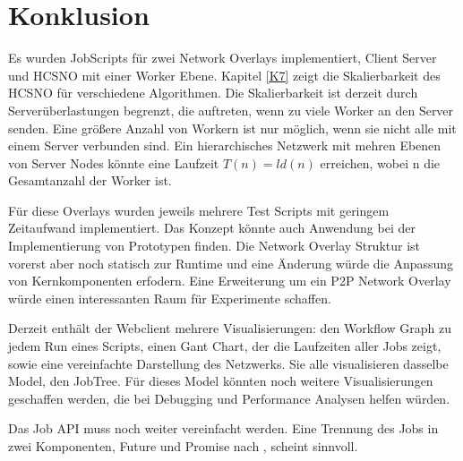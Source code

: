 \section{Konklusion}
Es wurden JobScripts für zwei Network Overlays implementiert, Client Server und HCSNO mit einer Worker Ebene. Kapitel \ref{K7} zeigt die Skalierbarkeit des HCSNO für verschiedene Algorithmen. Die Skalierbarkeit ist derzeit durch Serverüberlastungen begrenzt, die auftreten, wenn zu viele Worker an den Server senden. Eine größere Anzahl von Workern ist nur möglich, wenn sie nicht alle mit einem Server verbunden sind. Ein hierarchisches Netzwerk mit mehren Ebenen von Server Nodes könnte eine Laufzeit  $T(n) = ld(n)$ erreichen, wobei n die Gesamtanzahl der Worker ist.

Für diese Overlays wurden jeweils mehrere Test Scripts mit geringem Zeitaufwand  implementiert. Das Konzept könnte auch Anwendung bei der Implementierung von Prototypen finden. Die Network Overlay Struktur ist vorerst aber noch statisch zur Runtime und eine Änderung würde die Anpassung von Kernkomponenten erfodern. Eine Erweiterung um ein P2P Network Overlay würde einen interessanten Raum für Experimente schaffen.

Derzeit enthält der Webclient mehrere Visualisierungen: den Workflow Graph zu jedem Run eines Scripts, einen Gant Chart, der die Laufzeiten aller Jobs zeigt, sowie eine vereinfachte Darstellung des Netzwerks. Sie alle visualisieren dasselbe Model, den JobTree. Für dieses Model könnten noch weitere Visualisierungen geschaffen werden, die bei Debugging und Performance Analysen helfen würden.

Das Job API muss noch weiter vereinfacht werden. Eine Trennung des Jobs in zwei Komponenten, Future und Promise nach \cite{baker1977incremental}, scheint sinnvoll.
